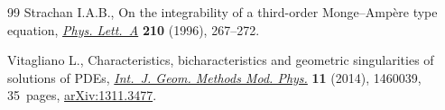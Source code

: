 \documentclass[pdftex]{sigma}
\numberwithin{equation}{section}
\begin{document}
\begin{thebibliography}{99}
Strachan I.A.B., On the integrability of a third-order {M}onge--{A}mp\`ere type
 equation, \href{http://dx.doi.org/10.1016/0375-9601(95)00944-2}{\textit{Phys. Lett.~A}} \textbf{210} (1996), 267--272.

Vitagliano L., Characteristics, bicharacteristics and geometric singularities
 of solutions of {PDE}s, \href{http://dx.doi.org/10.1142/S0219887814600391}{\textit{Int.~J. Geom. Methods Mod. Phys.}} \textbf{11}
 (2014), 1460039, 35~pages, \href{http://arxiv.org/abs/1311.3477}{arXiv:1311.3477}.

\end{thebibliography}\LastPageEnding
\end{document}

